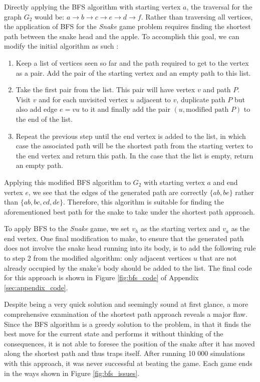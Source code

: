 \documentclass[12pt]{article}
\begin{document}
Directly applying the BFS algorithm with starting vertex $a$, the traversal for the graph $G_{2}$ would be: $a \rightarrow b \rightarrow c \rightarrow e \rightarrow d \rightarrow f$. Rather than traversing all vertices, the application of BFS for the \textit{Snake} game problem requires finding the shortest path between the snake head and the apple. To accomplish this goal, we can modify the initial algorithm as such \cite{bose_howat2015}:

\begin{enumerate}
	\item Keep a list of vertices seen so far and the path required to get to the vertex as a pair. Add the pair of the starting vertex and an empty path to this list.
	\item Take the first pair from the list. This pair will have vertex $v$ and path $P$. Visit $v$ and for each unvisited vertex $u$ adjacent to $v$, duplicate path $P$ but also add edge $e = vu$ to it and finally add the pair $(u, \textrm{modified path } P)$ to the end of the list.
	\item Repeat the previous step until the end vertex is added to the list, in which case the associated path will be the shortest path from the starting vertex to the end vertex and return this path. In the case that the list is empty, return an empty path.
\end{enumerate}

Applying this modified BFS algorithm to $G_{2} $ with starting vertex $a$ and end vertex $e$, we see that the edges of the generated path are correctly $\{ab, be\}$ rather than $\{ab, bc, cd, de\}$. Therefore, this algorithm is suitable for finding the aforementioned best path for the snake to take under the shortest path approach.

To apply BFS to the \textit{Snake} game, we set $v_{h}$ as the starting vertex and $v_{a}$ as the end vertex. One final modification to make, to ensure that the generated path does not involve the snake head running into its body, is to add the following rule to step 2 from the modified algorithm: only adjacent vertices $u$ that are not already occupied by the snake's body should be added to the list. The final code for this approach is shown in Figure \ref{fig:bfs_code} of Appendix \ref{sec:appendix_code}.

Despite being a very quick solution and seemingly sound at first glance, a more comprehensive examination of the shortest path approach reveals a major flaw. Since the BFS algorithm is a greedy solution to the problem, in that it finds the best move for the current state and performs it without thinking of the consequences, it is not able to foresee the position of the snake after it has moved along the shortest path and thus traps itself. After running 10 000 simulations with this approach, it was never successful at beating the game. Each game ends in the ways shown in Figure \ref{fig:bfs_issues}.
\end{document}
